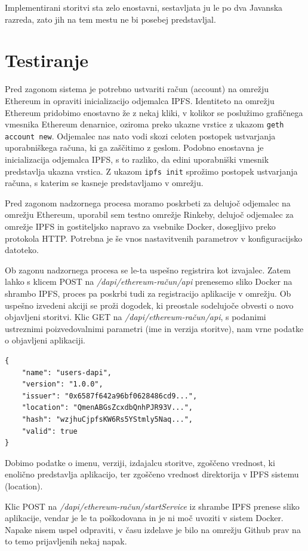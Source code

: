 \documentclass[a4paper, 12pt]{book}
\begin{document}
Implementirani storitvi sta zelo enostavni, sestavljata ju le po dva Javanska razreda, zato jih na tem mestu ne bi posebej predstavljal.

\section{Testiranje}
Pred zagonom sistema je potrebno ustvariti račun (account) na omrežju Ethereum in opraviti inicializacijo odjemalca IPFS.
Identiteto na omrežju Ethereum pridobimo enostavno že z nekaj kliki, v kolikor se poslužimo grafičnega vmesnika Ethereum denarnice, oziroma preko ukazne vrstice z ukazom \texttt{geth account new}.
Odjemalec nas nato vodi skozi celoten postopek ustvarjanja uporabniškega računa, ki ga zaščitimo z geslom.
Podobno enostavna je inicializacija odjemalca IPFS, s to razliko, da edini uporabniški vmesnik predstavlja ukazna vrstica.
Z ukazom \texttt{ipfs init} sprožimo postopek ustvarjanja računa, s katerim se kasneje predstavljamo v omrežju.

Pred zagonom nadzornega procesa moramo poskrbeti za delujoč odjemalec na omrežju Ethereum, uporabil sem testno omrežje Rinkeby, delujoč odjemalec za omrežje IPFS in gostiteljsko napravo za vsebnike Docker, dosegljivo preko protokola HTTP.
Potrebna je še vnos nastavitvenih parametrov v konfiguracijsko datoteko.

Ob zagonu nadzornega procesa se le-ta uspešno registrira kot izvajalec.
Zatem lahko s klicem POST na \textit{/dapi/{ethereum-račun}/api} prenesemo sliko Docker na shrambo IPFS, proces pa poskrbi tudi za registracijo aplikacije v omrežju.
Ob uspešno izvedeni akciji se proži dogodek, ki preostale sodelujoče obvesti o novo objavljeni storitvi.
Klic GET na \textit{/dapi/{ethereum-račun}/api}, s podanimi ustreznimi poizvedovalnimi parametri (ime in verzija storitve), nam vrne podatke o objavljeni aplikaciji.

\begin{lstlisting}
{
	"name": "users-dapi",
	"version": "1.0.0",
	"issuer": "0x6587f642a96bf0628486cd9...",
	"location": "QmenABGsZcxdbQnhPJR93V...",
	"hash": "wzjhuCjpfsKW6Rs5YStmly5Naq...",
	"valid": true
}	
\end{lstlisting}

Dobimo podatke o imenu, verziji, izdajalcu storitve, zgoščeno vrednost, ki enolično predstavlja aplikacijo, ter zgoščeno vrednost direktorija v IPFS sistemu (location).

Klic POST na \textit{/dapi/{ethereum-račun}/startService} iz shrambe IPFS prenese sliko aplikacije, vendar je le ta poškodovana in je ni moč uvoziti v sistem Docker.
Napake nisem uspel odpraviti, v času izdelave je bilo na omrežju Github prav na to temo prijavljenih nekaj napak.
\end{document}

